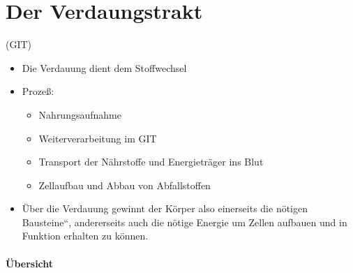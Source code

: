 \section{Der Verdaungstrakt}
{\quotedblbase}
(GIT)

\begin{itemize}
\item Die Verdauung dient dem Stoffwechsel
\item Proze{\ss}:
\begin{itemize}
\item Nahrungsaufnahme
\item Weiterverarbeitung im GIT
\item Transport der N\"ahrstoffe und Energietr\"ager  ins Blut
\item Zellaufbau und Abbau von Abfallstoffen
\end{itemize}
\item \"Uber die Verdauung gewinnt der K\"orper  also einerseits die
n\"otigen {\quotedblbase}Bausteine{\textquotedblleft},  andererseits
auch die n\"otige Energie um  Zellen aufbauen und in Funktion erhalten 
zu k\"onnen.
\end{itemize}

\paragraph{\"Ubersicht}~


